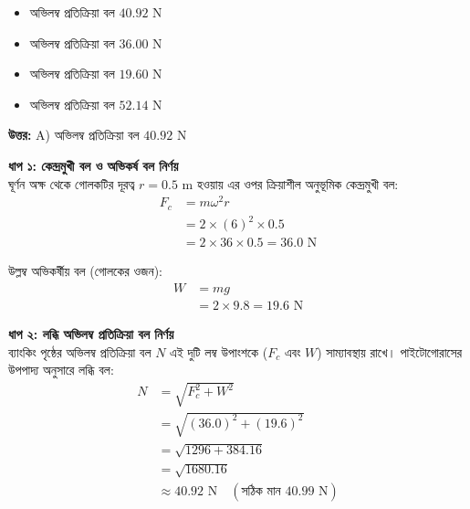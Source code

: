 \documentclass[12pt, a4paper]{article}
\begin{document}
\itemize
\begin{itemize}[label={}, leftmargin=1cm, itemsep=0.5em]
    \item[\textbf{A)}] অভিলম্ব প্রতিক্রিয়া বল $40.92\text{ N}$
    \item[\textbf{B)}] অভিলম্ব প্রতিক্রিয়া বল $36.00\text{ N}$
    \item[\textbf{C)}] অভিলম্ব প্রতিক্রিয়া বল $19.60\text{ N}$
    \item[\textbf{D)}] অভিলম্ব প্রতিক্রিয়া বল $52.14\text{ N}$
\end{itemize}

\vspace{0.5em}
\begin{tcolorbox}[answerbox]
    \textbf{\color{success} উত্তর:} A) অভিলম্ব প্রতিক্রিয়া বল $40.92\text{ N}$
\end{tcolorbox}
\vspace{1em}

\begin{tcolorbox}[solutionbox={সমাধান (Solution)}]
    \noindent
    \textbf{ধাপ ১: কেন্দ্রমুখী বল ও অভিকর্ষ বল নির্ণয়} \\
    ঘূর্ণন অক্ষ থেকে গোলকটির দূরত্ব $r = 0.5\text{ m}$ হওয়ায় এর ওপর ক্রিয়াশীল অনুভূমিক কেন্দ্রমুখী বল:
    \begin{align*}
        F_c &= m \omega^2 r \\
        &= 2 \times (6)^2 \times 0.5 \\
        &= 2 \times 36 \times 0.5 = 36.0\text{ N}
    \end{align*}
    
    উল্লম্ব অভিকর্ষীয় বল (গোলকের ওজন):
    \begin{align*}
        W &= m g \\
        &= 2 \times 9.8 = 19.6\text{ N}
    \end{align*}
    
    \vspace{0.5em}
    \noindent\textbf{ধাপ ২: লব্ধি অভিলম্ব প্রতিক্রিয়া বল নির্ণয়} \\
    ব্যাংকিং পৃষ্ঠের অভিলম্ব প্রতিক্রিয়া বল $N$ এই দুটি লম্ব উপাংশকে ($F_c$ এবং $W$) সাম্যাবস্থায় রাখে। 
    পাইটোগোরাসের উপপাদ্য অনুসারে লব্ধি বল:
    \begin{align*}
        N &= \sqrt{F_c^2 + W^2} \\
          &= \sqrt{(36.0)^2 + (19.6)^2} \\
          &= \sqrt{1296 + 384.16} \\
          &= \sqrt{1680.16} \\
          &\approx \mathbf{40.92}\text{ N} \quad (\text{সঠিক মান } 40.99\text{ N})
    \end{align*}
\end{tcolorbox}
\end{document}
